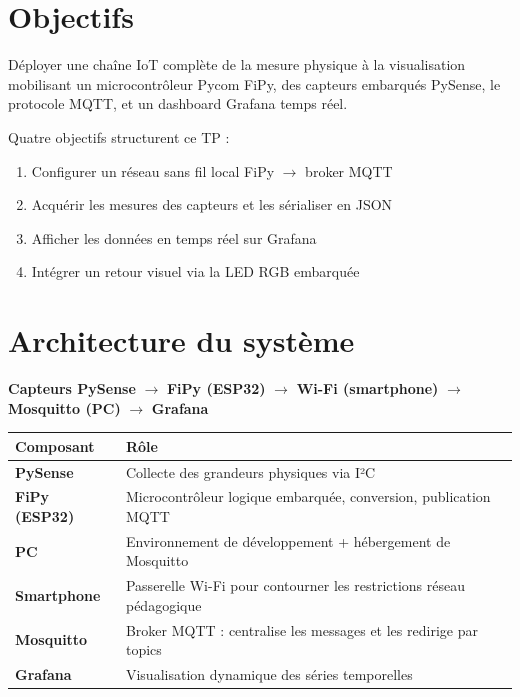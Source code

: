 \documentclass[11pt,a4paper]{article}
\begin{document}
\setcounter{page}{1}

{\sffamily
\hypersetup{linkcolor=primary}
\renewcommand{\contentsname}{\textcolor{accent}{\faList~} Sommaire}
\tableofcontents
}
\vspace{0.4cm}

\section{Objectifs}

\begin{infobox}[title={\faBullseye~Mission}]
Déployer une chaîne IoT complète \textemdash{} de la mesure physique à la visualisation \textemdash{} mobilisant un microcontrôleur Pycom FiPy, des capteurs embarqués PySense, le protocole MQTT, et un dashboard Grafana temps réel.
\end{infobox}

Quatre objectifs structurent ce TP :
\begin{enumerate}
  \item Configurer un réseau sans fil local FiPy $\rightarrow$ broker MQTT
  \item Acquérir les mesures des capteurs et les sérialiser en JSON
  \item Afficher les données en temps réel sur Grafana
  \item Intégrer un retour visuel via la LED RGB embarquée
\end{enumerate}

\section{Architecture du système}

\begin{archbox}[title={\faProjectDiagram~Chaîne de traitement}]
\textbf{Capteurs PySense} $\rightarrow$ \textbf{FiPy (ESP32)} $\rightarrow$ \textbf{Wi-Fi (smartphone)} $\rightarrow$ \textbf{Mosquitto (PC)} $\rightarrow$ \textbf{Grafana}
\end{archbox}

\renewcommand{\arraystretch}{1.3}
\begin{tabularx}{\linewidth}{@{}>{\bfseries}p{2.8cm} X@{}}
\toprule
\rowcolor{light} Composant & Rôle \\ \midrule
PySense       & Collecte des grandeurs physiques via I²C \\
FiPy (ESP32)  & Microcontrôleur \textemdash{} logique embarquée, conversion, publication MQTT \\
PC            & Environnement de développement + hébergement de Mosquitto \\
Smartphone    & Passerelle Wi-Fi pour contourner les restrictions réseau pédagogique \\
Mosquitto     & Broker MQTT : centralise les messages et les redirige par topics \\
Grafana       & Visualisation dynamique des séries temporelles \\
\bottomrule
\end{tabularx}
\end{document}
